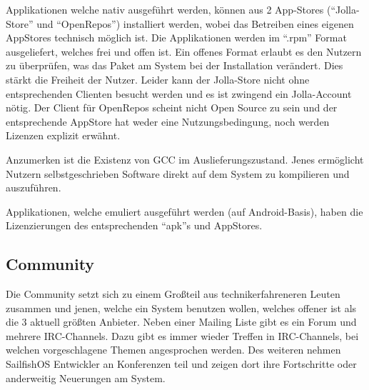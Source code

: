 Applikationen welche nativ ausgeführt werden, können aus 2 App-Stores (``\mbox{Jolla-Store}'' und ``\mbox{OpenRepos}''\thinspace\cite{online:openrepos}) installiert werden, wobei das Betreiben eines eigenen AppStores technisch möglich ist. Die Applikationen werden im ``\mbox{.rpm}'' Format ausgeliefert, welches frei und offen\thinspace\cite{online:rpm-license} ist. Ein offenes Format erlaubt es den Nutzern zu überprüfen, was das Paket am System bei der Installation verändert. Dies stärkt  die Freiheit der Nutzer. Leider kann der \mbox{Jolla-Store} nicht ohne entsprechenden Clienten besucht werden und es ist zwingend ein Jolla-Account nötig\thinspace\cite{online:jolla-store}. Der Client für \mbox{OpenRepos} scheint nicht Open Source zu sein und der entsprechende AppStore hat weder eine Nutzungsbedingung, noch werden Lizenzen explizit erwähnt.

Anzumerken ist die Existenz von GCC im Auslieferungszustand. Jenes ermöglicht Nutzern selbstgeschrieben Software direkt auf dem System zu kompilieren\thinspace\cite{online:sailfish-list-licenses} und auszuführen.

Applikationen, welche emuliert ausgeführt werden (auf Android-Basis), haben die Lizenzierungen des entsprechenden ``apk''s und AppStores.
\newline

\subsection{Community}
Die Community setzt sich zu einem Großteil aus technikerfahreneren Leuten zusammen und jenen, welche ein System benutzen wollen, welches offener ist als die 3 aktuell größten Anbieter. Neben einer Mailing Liste gibt es ein Forum und mehrere \mbox{IRC-Channels}\thinspace\cite{online:sailfish-communitygeneral}. Dazu gibt es immer wieder Treffen in \mbox{IRC-Channels}, bei welchen vorgeschlagene Themen angesprochen werden. Des weiteren nehmen \mbox{SailfishOS} Entwickler an Konferenzen teil und zeigen dort ihre Fortschritte oder anderweitig Neuerungen am System.
\iffalse
\subsubsection{Developer Support}
\thinspace\cite{online:jolla-store-terms}
https://harbour.jolla.com/\\
https://github.com/sailfishos\\
https://talk.maemo.org/showthread.php?t=92852\\
http://talk.maemo.org/showthread.php?p=1482661\#post1482661\\
https://github.com/maliit\\
https://talk.maemo.org/showthread.php?t=92036\\
\fi
\newline

